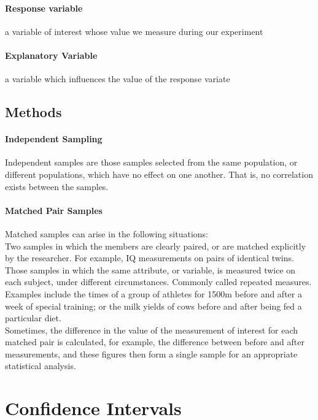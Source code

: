 \documentclass[12pt]{report}
\begin{document}
      \paragraph{Response variable} a variable of interest whose value we measure during our experiment
      \paragraph{Explanatory Variable} a variable which influences the value of the response variate

    \subsection{Methods}
      \paragraph{Independent Sampling} Independent samples are those samples selected from the same population, or different populations, which have no effect on one another. That is, no correlation exists between the samples.
      \paragraph{Matched Pair Samples} Matched samples can arise in the following situations:\\

        Two samples in which the members are clearly paired, or are matched explicitly by the researcher. For example, IQ measurements on pairs of identical twins. \\

        Those samples in which the same attribute, or variable, is measured twice on each subject, under different circumstances. Commonly called repeated measures. Examples include the times of a group of athletes for 1500m before and after a week of special training; or the milk yields of cows before and after being fed a particular diet.\\

        Sometimes, the difference in the value of the measurement of interest for each matched pair is calculated, for example, the difference between before and after measurements, and these figures then form a single sample for an appropriate statistical analysis.

  \section{Confidence Intervals}
\end{document}
